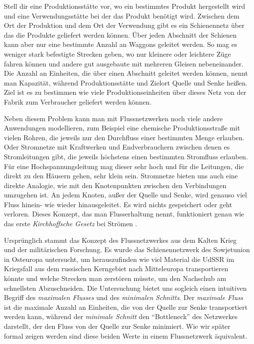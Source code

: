 Stell dir eine Produktionsstätte vor, wo ein bestimmtes Produkt hergestellt wird und eine Verwendungsstätte bei der das Produkt benötigt wird. Zwischen dem Ort der Produktion und dem Ort der Verwendung gibt es ein Schienennetz über das die Produkte geliefert werden können. Über jeden Abschnitt der Schienen kann aber nur eine bestimmte Anzahl an Waggons geleitet werden. So mag es weniger stark befestigte Strecken geben, wo nur kleinere oder leichtere Züge fahren können und andere gut ausgebaute mit mehreren Gleisen nebeneinander. Die Anzahl an Einheiten, die über einen Abschnitt geleitet werden können, nennt man Kapazität, während Produktionsstätte und Zielort Quelle und Senke heißen. Ziel ist es zu bestimmen wie viele Produktionseinheiten über dieses Netz von der Fabrik zum Verbraucher geliefert werden können.

Neben diesem Problem kann man mit Flussnetzwerken noch viele andere Anwendungen modellieren, zum Beispiel eine chemische Produktionsstraße mit vielen Rohren, die jeweils nur den Durchfluss einer bestimmten Menge erlauben. Oder Stromnetze mit Kraftwerken und Endverbrauchern zwischen denen es Stromleitungen gibt, die jeweils höchstens einen bestimmten Stromfluss erlauben. Für eine Hochspannungsleitung mag dieser sehr hoch und für die Leitungen, die direkt zu den Häusern gehen, sehr klein sein. Stromnetze bieten uns auch eine direkte Analogie, wie mit den Knotenpunkten zwischen den Verbindungen umzugehen ist. An jedem Knoten, außer der Quelle und Senke, wird genauso viel Fluss hinein- wie wieder hinausgeleitet. Es wird nichts gespeichert oder geht verloren. Dieses Konzept, das man Flusserhaltung nennt, funktioniert genau wie das erste \emph{Kirchhoffsche Gesetz} bei Strömen \cite[S.708]{clrs09}. 

Ursprünglich stammt das Konzept des Flussnetzwerkes aus dem Kalten Krieg und der militärischen Forschung. Es wurde das Schienennetzwerk des Sowjetunion in Osteuropa untersucht, um herauszufinden wie viel Material die UdSSR im Kriegsfall aus dem russischen Kerngebiet nach Mitteleuropa transportieren könnte und welche Strecken man zerstören müsste, um den Nachschub am schnellsten Abzuschneiden. Die Untersuchung bietet uns sogleich einen intuitiven Begriff des \emph{maximalen Flusses} und des \emph{minimalen Schnitts}. Der \emph{maximale Fluss} ist die maximale Anzahl an Einheiten, die von der Quelle zur Senke transportiert werden kann, während der \emph{minimale Schnitt} den \enquote{Bottleneck} des Netzwerkes darstellt, der den Fluss von der Quelle zur Senke minimiert. Wie wir später formal zeigen werden sind diese beiden Werte in einem Flussnetzwerk äquivalent.

